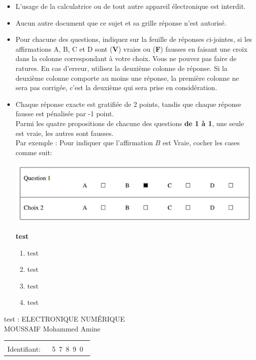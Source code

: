 \documentclass{book}%
\begin{document}
\begin{itemize}%
\item%
L'usage de la calculatrice ou de tout autre appareil électronique est interdit.%
\item%
Aucun autre document que ce sujet et sa grille réponse n'est autorisé.%
\item%
Pour chacune des questions, indiquez sur la feuille de réponses ci-jointes, si les affirmations A, B, C et D sont (\textbf{V}) vraies ou (\textbf{F}) fausses en faisant une croix dans la colonne correspondant à votre choix. Vous ne pouvez pas faire de ratures. En cas d'erreur, utilisez la deuxième colonne de réponse. Si la deuxième colonne comporte au moins une réponse, la première colonne ne sera pas corrigée, c'est la deuxième qui sera prise en considération.%
\item%
Chaque réponse exacte est gratifiée de 2 points, tandis que chaque réponse fausse est pénalisée par -1 point. \\ 	Parmi les quatre propositions de chacune des questions \textbf{de 1 à 1}, une seule est vraie, les autres sont fausses. \\ 	Par exemple : Pour indiquer que l'affirmation $B$ est Vraie, cocher les cases comme suit:  \\ \begin{center}	\includegraphics[scale=0.8]{reponses.png} \end{center}%
\thispagestyle{empty}%
\begin{exercise}%
\textbf{test }%
\begin{enumerate}[label=\textbf{\Alph*. }]%
\item%
test%
\item%
test%
\item%
test%
\item%
test%
\end{enumerate}%
\end{exercise}%
\end{itemize}%
\newpage%
\thispagestyle{empty}%
test : ELECTRONIQUE NUMÉRIQUE $\qquad \qquad \qquad \qquad \qquad \qquad \qquad \qquad$ MOUSSAIF Mohammed Amine%
\begin{flushright}%
\begin{tabular}{|l|}%
\hline%
 \\%
\thispagestyle{empty}%
Identifiant: $\quad$ {\Large 5~7~8~9~0~}%
 \\%
\hline%
\end{tabular}%
\end{flushright}%
\end{document}
